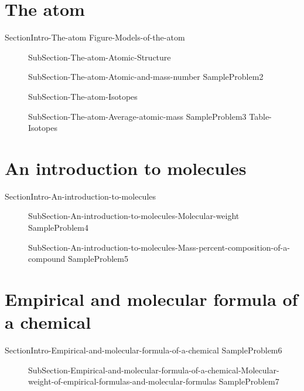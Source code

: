 \documentclass[main.tex]{subfiles}
\newcommand\chapterlabel{Ch-Table}\setcounter{figurenewcounter}{0}\setcounter{tablenewcounter}{0}\setcounter{formulanewcounter}{0}\chapterpicture{../{\chapterlabel}/figure1}\chapterpicturelabel{PxFuel}
\begin{document}
\section{The atom}
{SectionIntro-The-atom}
 {Figure-Models-of-the-atom}
\sloppy\begin{description}
\item[] {SubSection-The-atom-Atomic-Structure}
\item[] {SubSection-The-atom-Atomic-and-mass-number}
{SampleProblem2}
\item[]{SubSection-The-atom-Isotopes}
\item[] {SubSection-The-atom-Average-atomic-mass}
{SampleProblem3}
 {Table-Isotopes}
\end{description}


\section{An introduction to molecules}{SectionIntro-An-introduction-to-molecules} 
\sloppy\begin{description} 
\item[] {SubSection-An-introduction-to-molecules-Molecular-weight} 
{SampleProblem4} 
\item[]{SubSection-An-introduction-to-molecules-Mass-percent-composition-of-a-compound} 
{SampleProblem5} 
\end{description} 


\section{Empirical and molecular formula of a chemical} {SectionIntro-Empirical-and-molecular-formula-of-a-chemical} 
{SampleProblem6} 
\sloppy\begin{description} 
\item[]{SubSection-Empirical-and-molecular-formula-of-a-chemical-Molecular-weight-of-empirical-formulas-and-molecular-formulas} 
{SampleProblem7} 
\end{description} 
\end{document}
